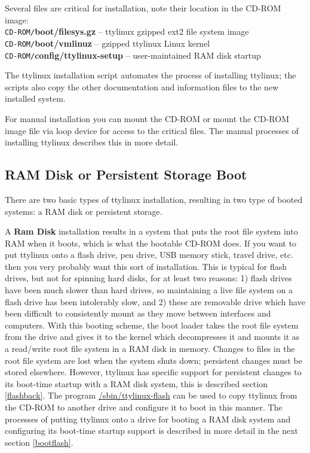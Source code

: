 \documentclass[10pt]{article}
\begin{document}
Several files are critical for installation, note their location in the CD-ROM
image:\\
{\tt CD-ROM/}{\bf boot/filesys.gz} -- ttylinux gzipped ext2 file system image\\
{\tt CD-ROM/}{\bf boot/vmlinuz} -- gzipped ttylinux Linux kernel\\
{\tt CD-ROM/}{\bf config/ttylinux-setup} -- user-maintained RAM disk startup

The ttylinux installation script automates the process of installing ttylinux;
the scripts also copy the other documentation and information files to the new
installed system.

For manual installation you can mount the CD-ROM or mount the CD-ROM image file
via loop device for access to the critical files. The manual processes of
installing ttylinux describes this in more detail.

\subsection{RAM Disk or Persistent Storage Boot}

There are two basic types of ttylinux installation, resulting in two type of
booted systems: a RAM disk or persistent storage.

A {\bf Ram Disk} installation results in a system that puts the root file
system into RAM when it boots, which is what the bootable CD-ROM does. If you
want to put ttylinux onto a flash drive, pen drive, USB memory stick, travel
drive, etc. then you very probably want this sort of installation. This is
typical for flash drives, but not for spinning hard disks, for at least two
reasons: 1) flash drives have been much slower than hard drives, so maintaining
a live file system on a flash drive has been intolerably slow, and 2) these are
removable drive which have been difficult to consistently mount as they move
between interfaces and computers. With this booting scheme, the boot loader
takes the root file system from the drive and gives it to the kernel which
decompresses it and mounts it as a read/write root file system in a RAM disk in
memory. Changes to files in the root file system are lost when the system shuts
down; persistent changes must be stored elsewhere. However, ttylinux has
specific support for persistent changes to its boot-time startup with a RAM
disk system, this is described section \ref{flashback}. The program
\url{/sbin/ttylinux-flash} can be used to copy ttylinux from the CD-ROM to
another drive and configure it to boot in this manner. The processes of putting
ttylinux onto a drive for booting a RAM disk system and configuring its
boot-time startup support is described in more detail in the next section
\ref{bootflash}.
\end{document}
